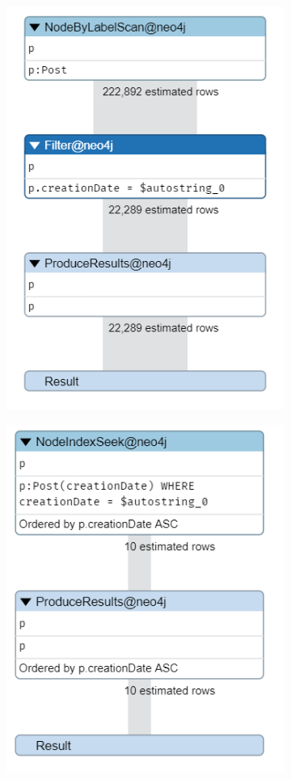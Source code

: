 \begin{figure}[H]
	\begin{subfigure}{0.5\textwidth}
		\includegraphics[width=0.9\linewidth]{img/post_without_index_1.png} 
	\end{subfigure}
	\begin{subfigure}{0.5\textwidth}
		\includegraphics[width=0.9\linewidth]{img/post_with_index_1.png}

\end{subfigure}
\end{figure}
